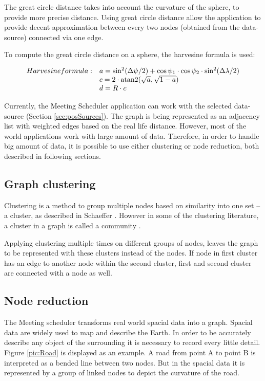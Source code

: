\documentclass[thesis=M,english]{FITthesis}[2012/10/20]
\DeclareMathOperator{\atantwo}{atan2}
\begin{document}
The great circle distance takes into account the curvature of the sphere, to provide more precise distance. Using great circle distance allow the application to provide decent approximation between every two nodes (obtained from the data-source) connected via one edge.

To compute the great circle distance on a sphere, the harvesine formula is used: 

$$
\begin{array}{l l}
Harvesine formula: & a = \sin^2(\Delta \psi /2) + \cos \psi_1 \cdot \cos \psi_2 \cdot \sin^2(\Delta \lambda /2) \\
& c = 2 \cdot \atantwo ( \sqrt{a}, \sqrt{1 - a} ) \\
& d = R \cdot c
\end{array}
$$ 

Currently, the Meeting Scheduler application can work with the selected data-source (Section \ref{sec:posSources}). The graph is being represented as an adjacency list with weighted edges based on the real life distance. However, most of the world applications work with large amount of data. Therefore, in order to handle big amount of data, it is possible to use either clustering or node reduction, both described in following sections.

\subsection{Graph clustering}
\label{sec:Clustering}
Clustering is a method to group multiple nodes based on similarity into one set -- a cluster, as described in Schaeffer \cite{Schaeffer07}. However in some of the clustering literature, a cluster in a graph is called a community \cite{Newman04}.

Applying clustering multiple times on different groups of nodes, leaves the graph to be represented with these clusters instead of the nodes. If node in first cluster has an edge to another node within the second cluster, first and second cluster are connected with a node as well. 





\subsection{Node reduction}
\label{sec:NodeReduction}
The Meeting scheduler transforms real world spacial data into a graph. Spacial data are widely used to map and describe the Earth. In order to be accurately describe any object of the surrounding it is necessary to record every little detail. Figure \ref{pic:Road} is displayed as an example. A road from point A to point B is interpreted as a bended line between two nodes. But in the spacial data it is represented by a group of linked nodes to depict the curvature of the road.
\end{document}
